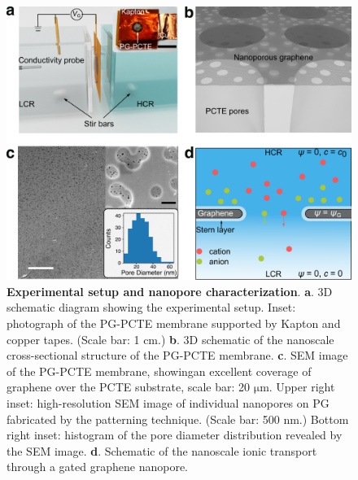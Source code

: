 \documentclass[journal=langd5,email=true, hyperref=true, keywords=false]{achemso}
\begin{document}
\begin{figure}[htbp]
  \centering
  \includegraphics[width=0.95\linewidth]{img/fig1.pdf}
  \caption{\textbf{Experimental setup and nanopore characterization}.
    \textbf{a}. 3D schematic diagram showing the experimental
    setup. Inset: photograph of the PG-PCTE membrane supported by
    Kapton and copper tapes. (Scale bar: 1 cm.) \textbf{b}. 3D schematic
    of the nanoscale cross-sectional structure of the PG-PCTE
    membrane. \textbf{c}. SEM image of the PG-PCTE membrane, showingan
    excellent coverage of graphene over the PCTE substrate, scale bar:
    20 $\mathrm{\mu}$m.  Upper right inset: high-resolution SEM image
    of individual nanopores on PG fabricated by the patterning
    technique. (Scale bar: 500 nm.) Bottom right inset: histogram of the
    pore diameter distribution revealed by the SEM
    image. \textbf{d}. Schematic of the nanoscale ionic transport
    through a gated graphene nanopore.}
  \label{fig:1}
\end{figure}
\end{document}
